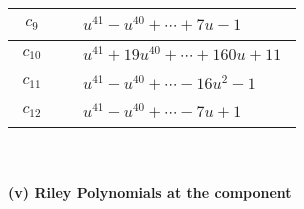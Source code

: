 \documentclass[1p]{elsarticle_modified}
\theoremstyle{definition}
\begin{document}
\begin{tabular}{m{50pt}|m{274pt}}
\hline $$\begin{aligned}c_{9}\end{aligned}$$&$\begin{aligned}
&u^{41}- u^{40}+\cdots+7 u-1
\end{aligned}$\\
\hline $$\begin{aligned}c_{10}\end{aligned}$$&$\begin{aligned}
&u^{41}+19 u^{40}+\cdots+160 u+11
\end{aligned}$\\
\hline $$\begin{aligned}c_{11}\end{aligned}$$&$\begin{aligned}
&u^{41}- u^{40}+\cdots-16 u^2-1
\end{aligned}$\\
\hline $$\begin{aligned}c_{12}\end{aligned}$$&$\begin{aligned}
&u^{41}- u^{40}+\cdots-7 u+1
\end{aligned}$\\
\hline
\end{tabular}\\~\\
\newpage\renewcommand{\arraystretch}{1}
\flushleft \textbf{(v) Riley Polynomials at the component}\newline \\
\end{document}
